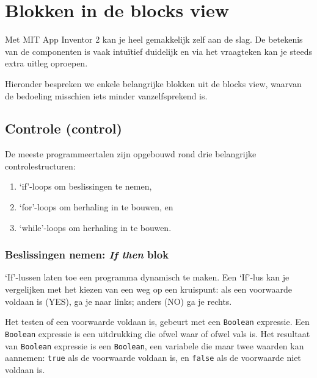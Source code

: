 \section{Blokken in de blocks view}
\label{sec:Mod2_Sec2}
%
Met MIT App Inventor 2 kan je heel gemakkelijk zelf aan de slag. De betekenis van de componenten is vaak intu\"itief duidelijk en via het vraagteken kan je steeds extra uitleg oproepen. 

Hieronder bespreken we enkele belangrijke blokken uit de blocks view, waarvan de bedoeling misschien iets minder vanzelfsprekend is.

\subsection{Controle (control)}
De meeste programmeertalen zijn opgebouwd rond drie belangrijke controlestructuren: 

\begin{enumerate}
	\item \textquoteleft if\textquoteright-loops om beslissingen te nemen, 
	\item \textquoteleft for\textquoteright-loops om herhaling in te bouwen, en
	\item  \textquoteleft while\textquoteright-loops om herhaling in te bouwen.
\end{enumerate}

\subsubsection{Beslissingen nemen: \emph{If then} blok}

\begin{minipage}{.5\linewidth}
\end{minipage}
\begin{minipage}{.5\linewidth}
\end{minipage}

\textquoteleft If\textquoteright-lussen laten toe een programma dynamisch te maken. Een \textquoteleft If\textquoteright-lus kan je vergelijken met het kiezen van een weg op een kruispunt: als een voorwaarde voldaan is (YES), ga je naar links; anders (NO) ga je rechts. 

Het testen of een voorwaarde voldaan is, gebeurt met een \texttt{Boolean} expressie.
Een \texttt{Boolean} expressie is een uitdrukking die ofwel waar of ofwel vals is.
Het resultaat van \texttt{Boolean} expressie is een \texttt{Boolean}, een variabele die maar twee waarden kan aannemen: \texttt{true} als de voorwaarde voldaan is, en \texttt{false} als de voorwaarde niet voldaan is.

